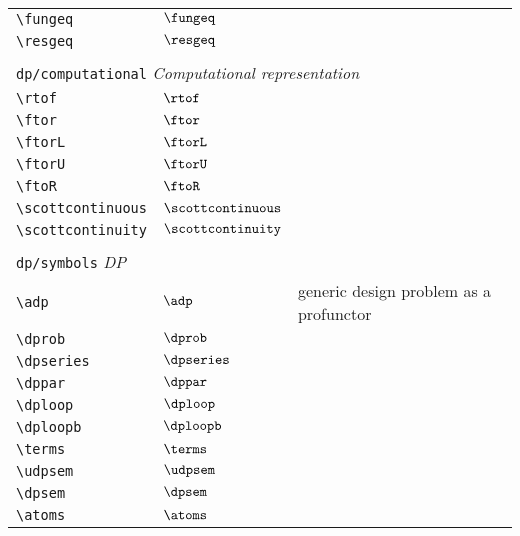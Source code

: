 \begin{longtable}{lll}
 {\color[rgb]{0.5,0.5,0.5}\texttt{\textbackslash fungeq}} & $\fungeq$ & \\ 
 {\color[rgb]{0.5,0.5,0.5}\texttt{\textbackslash resgeq}} & $\resgeq$ & \\ 
  &  & \\ 
 \multicolumn{3}{l}{{\color[rgb]{0.5,0.5,0.5}\texttt{dp/computational}} \emph{Computational representation}}\\ 
 \hline
{\color[rgb]{0.5,0.5,0.5}\texttt{\textbackslash rtof}} & $\rtof$ & \\ 
 {\color[rgb]{0.5,0.5,0.5}\texttt{\textbackslash ftor}} & $\ftor$ & \\ 
 {\color[rgb]{0.5,0.5,0.5}\texttt{\textbackslash ftorL}} & $\ftorL$ & \\ 
 {\color[rgb]{0.5,0.5,0.5}\texttt{\textbackslash ftorU}} & $\ftorU$ & \\ 
 {\color[rgb]{0.5,0.5,0.5}\texttt{\textbackslash ftoR}} & $\ftoR$ & \\ 
 {\color[rgb]{0.5,0.5,0.5}\texttt{\textbackslash scottcontinuous}} & $\scottcontinuous$ & \\ 
 {\color[rgb]{0.5,0.5,0.5}\texttt{\textbackslash scottcontinuity}} & $\scottcontinuity$ & \\ 
  &  & \\ 
 \multicolumn{3}{l}{{\color[rgb]{0.5,0.5,0.5}\texttt{dp/symbols}} \emph{DP}}\\ 
 \hline
{\color[rgb]{0.5,0.5,0.5}\texttt{\textbackslash adp}} & $\adp$ &  generic design problem as a profunctor\\ 
 {\color[rgb]{0.5,0.5,0.5}\texttt{\textbackslash dprob}} & $\dprob$ & \\ 
 {\color[rgb]{0.5,0.5,0.5}\texttt{\textbackslash dpseries}} & $\dpseries$ & \\ 
 {\color[rgb]{0.5,0.5,0.5}\texttt{\textbackslash dppar}} & $\dppar$ & \\ 
 {\color[rgb]{0.5,0.5,0.5}\texttt{\textbackslash dploop}} & $\dploop$ & \\ 
 {\color[rgb]{0.5,0.5,0.5}\texttt{\textbackslash dploopb}} & $\dploopb$ & \\ 
 {\color[rgb]{0.5,0.5,0.5}\texttt{\textbackslash terms}} & $\terms$ & \\ 
 {\color[rgb]{0.5,0.5,0.5}\texttt{\textbackslash udpsem}} & $\udpsem$ & \\ 
 {\color[rgb]{0.5,0.5,0.5}\texttt{\textbackslash dpsem}} & $\dpsem$ & \\ 
 {\color[rgb]{0.5,0.5,0.5}\texttt{\textbackslash atoms}} & $\atoms$ & \\ 

\end{longtable}
